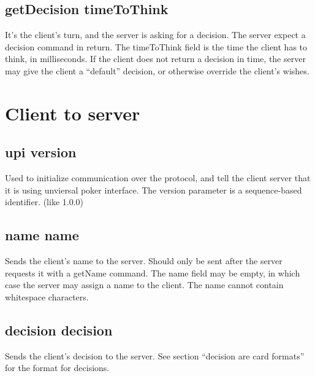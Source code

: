 \documentclass{article}
\begin{document}
\subsection{getDecision \textlangle{}timeToThink\textrangle{}}
It's the client's turn, and the server is asking for a decision. The server expect a decision command in return. The timeToThink field is the time the client has to think, in milliseconds. If the client does not return a decision in time, the server may give the client a ``default'' decision, or otherwise override the client's wishes.

\section{Client to server}

\subsection{upi \textlangle{}version\textrangle{}}
Used to initialize communication over the protocol, and tell the client server that it is using unviersal poker interface. The version parameter is a sequence-based identifier. (like 1.0.0)

\subsection{name \textlangle{}name\textrangle{}}
Sends the client's name to the server. Should only be sent after the server requests it with a getName command. The name field may be empty, in which case the server may assign a name to the client. The name cannot contain whitespace characters.

\subsection{decision \textlangle{}decision\textrangle{}}
Sends the client's decision to the server. See section ``decision are card formats'' for the format for decisions.
\end{document}
